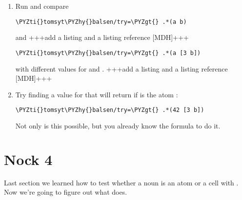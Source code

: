 \begin{enumerate}
\item Run and compare
\begin{framed_shaded}
\begin{Verbatim}[fontsize=\relsize{-2.5},commandchars=\\\{\}]
\PYZti{}tomsyt\PYZhy{}balsen/try=\PYZgt{} .*(a b)
\end{Verbatim}
\end{framed_shaded}
and +++add a listing and a listing reference [MDH]+++
\begin{framed_shaded}
\begin{Verbatim}[fontsize=\relsize{-2.5},commandchars=\\\{\}]
\PYZti{}tomsyt\PYZhy{}balsen/try=\PYZgt{} .*(a [3 b])
\end{Verbatim}
\end{framed_shaded}
with different values for  and . +++add a listing and a listing reference [MDH]+++
\item Try finding a value for  that will return  if  is the atom :
\begin{framed_shaded}
\begin{Verbatim}[fontsize=\relsize{-2.5},commandchars=\\\{\}]
\PYZti{}tomsyt\PYZhy{}balsen/try=\PYZgt{} .*(42 [3 b])
\end{Verbatim}
\end{framed_shaded}
Not only is this possible, but you already know the formula to do it.
\end{enumerate}

\section{Nock 4}

\label{sec:nock_4}

Last section we learned how to test whether a noun is an atom or a cell with
. Now we're going to figure out what  does.

